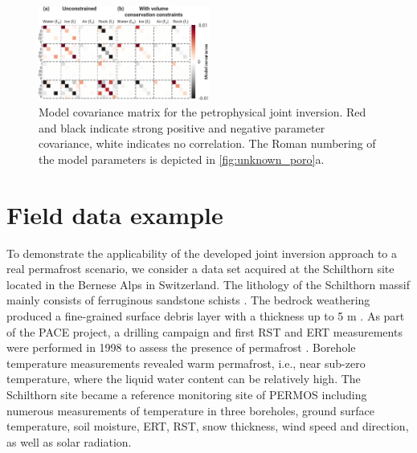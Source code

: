 \documentclass[extra]{gji}
\begin{document}
\begin{figure}
 \centering
 \includegraphics[width=0.5\textwidth]{./Fig4_one_column}
 \caption{Model covariance matrix for the petrophysical joint inversion. Red and black indicate strong positive and negative parameter covariance, white indicates no correlation. The Roman numbering of the model parameters is depicted in \autoref{fig:unknown_poro}a.}
 \label{fig:cov}
\end{figure}

\section{Field data example}

To demonstrate the applicability of the developed joint inversion approach to a real permafrost scenario, we consider a data set acquired at the Schilthorn site located in the Bernese Alps in Switzerland.
The lithology of the Schilthorn massif mainly consists of ferruginous sandstone schists \citep{Imhof2000}.
The bedrock weathering produced a fine-grained surface debris layer with a thickness up to 5 m \citep{Hilbich2008}.
As part of the PACE project, a drilling campaign and first RST and ERT measurements were performed in 1998 to assess the presence of permafrost \citep{VonderMuehll2000}.
Borehole temperature measurements revealed warm permafrost, i.e., near sub-zero temperature, where the liquid water content can be relatively high.
The Schilthorn site became a reference monitoring site of PERMOS \citep[Swiss Permafrost Monitoring Network,][]{permos2016} including numerous measurements of temperature in three boreholes, ground surface temperature, soil moisture, ERT, RST, snow thickness, wind speed and direction, as well as solar radiation.
\end{document}

